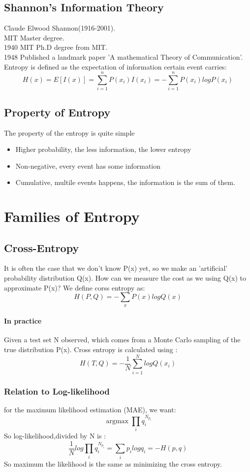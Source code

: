 \documentclass{article}
\begin{document}
\subsection{Shannon's Information Theory}
Claude Elwood Shannon(1916-2001).\\
 MIT Master degree.\\
1940 MIT Ph.D degree from MIT. \\
1948 Published a landmark paper 'A mathematical Theory of Communication'.\\
Entropy is defined as the expectation of information certain event carries:
$$H(x)=E[I(x)]=\sum_{i=1}^{n}P(x_{i})I(x_{i})=-\sum_{i=1}^{n}P(x_{i})logP(x_{i})$$
\subsection{Property of Entropy}
The property of the entropy is quite simple
\begin{itemize}
\item Higher probability, the less information, the lower entropy
\item Non-negative, every event has some information
\item Cumulative, multile events happens, the information is the sum of them.
\end{itemize}
\section{Families of Entropy}
\subsection{Cross-Entropy}
It is often the case that we don't know P(x) yet, so we make an 'artificial' probability distribution Q(x). How can we measure the cost as we using Q(x) to approximate P(x)? We define corss entropy as:
$$H(P,Q)=-\sum_{x}P(x)logQ(x)$$

\paragraph{In practice} Given a test set N observed, which comes from a Monte Carlo sampling of the true distribution P(x). Cross entropy is calculated using :
$$H(T,Q)=-\frac{1}{N}\sum_{i=1}^{N}logQ(x_{i})$$
\subsubsection{Relation to Log-likelihood}
for the maximum likelihood estimation (MAE), we want:
$$ \mathop{\arg\max} \prod_{i}q_{i}^{N_{p_{i}}}$$ 
So log-likelihood,divided by N is :
$$\frac{1}{N}log\prod_{i}q_{i}^{N_{p_{i}}}=\sum_{i}p_{i}logq_{i}=-H(p,q)$$
So maximum the likelihood is the same as minimizing the cross entropy.
\end{document}
